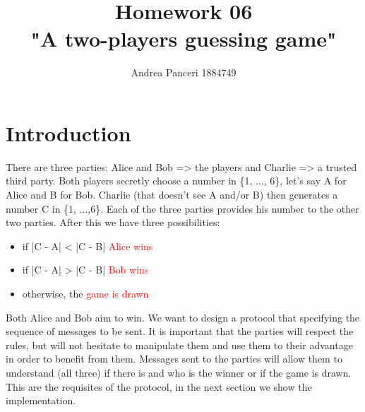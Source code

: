 \documentclass{article}
\title{Homework 06\\"A two-players guessing game"}
\author{Andrea Panceri 1884749}
\begin{document}
\maketitle

\section{Introduction}
There are three parties: Alice and Bob => the players and Charlie  => a trusted third party. Both players secretly choose a number in \{1, ..., 6\}, let's say A for Alice and B for Bob. Charlie (that doesn't see A and/or B) then generates a number C in \{1, ...,6\}. Each of the three parties provides his number to the other two parties. After this we have three possibilities:\\
\begin{itemize}
  \item if |C - A| < |C - B| \textcolor{red}{Alice wins}
  \item if |C - A| > |C - B| \textcolor{red}{Bob wins}
  \item otherwise, the \textcolor{red}{game is drawn}
\end{itemize}
Both Alice and Bob aim to win. We want to design a protocol that specifying the sequence of messages to be sent. It is important that the parties will respect the rules, but will not hesitate to manipulate them and use them to their advantage in order to benefit from them. Messages sent to the parties will allow them to understand (all three) if there is and who is the winner or if the game is drawn. This are the requisites of the protocol, in the next section we show the implementation.
\end{document}
